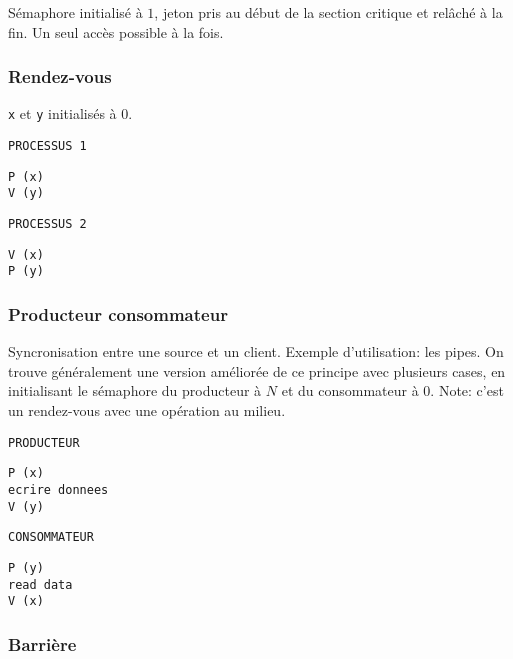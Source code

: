 \documentclass[a4paper]{article}
\begin{document}
\begin{multicols*}{2}
    Sémaphore initialisé à $1$, jeton pris au début de la section critique et relâché à la fin. Un seul accès possible à la fois. 

    \subsubsection{Rendez-vous}

    \texttt{x} et \texttt{y} initialisés à $0$.

    \begin{multicols}{2}
        \texttt{PROCESSUS 1}
        \begin{lstlisting}
P (x)
V (y)
        \end{lstlisting}

        \columnbreak{}
        
        \texttt{PROCESSUS 2}
        \begin{lstlisting}
V (x)
P (y)
        \end{lstlisting}
    \end{multicols}

    \subsubsection{Producteur consommateur}

    Syncronisation entre une source et un client. Exemple d'utilisation: les pipes.
    On trouve généralement une version améliorée de ce principe avec plusieurs cases, en initialisant le sémaphore du producteur à $N$ et du consommateur à $0$.
    Note: c'est un rendez-vous avec une opération au milieu.

    \begin{multicols}{2}
        \texttt{PRODUCTEUR}
        \begin{lstlisting}
P (x) 
ecrire donnees
V (y)
        \end{lstlisting}
        \columnbreak{}
        \texttt{CONSOMMATEUR}
        \hspace{0cm}
        \begin{lstlisting}
P (y) 
read data
V (x) 
        \end{lstlisting}
    \end{multicols}



    \subsubsection{Barrière}


\end{multicols*}
\end{document}
